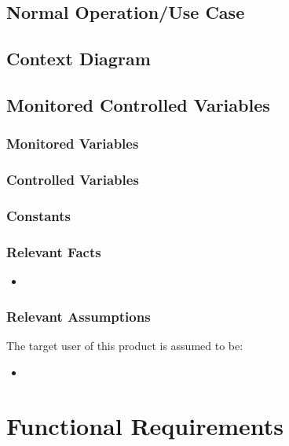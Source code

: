 \documentclass[12pt, titlepage]{article}
\begin{document}
\subsection{Normal Operation/Use Case}

\subsection{Context Diagram}



\subsection{Monitored Controlled Variables}

\subsubsection{Monitored Variables}

\subsubsection{Controlled Variables}

\subsubsection{Constants}

\subsubsection{Relevant Facts}

\begin{itemize}
\item
\end{itemize}

\subsubsection{Relevant Assumptions}

The target user of this product is assumed to be:
\begin{itemize}
\item
\end{itemize}

\section{Functional Requirements}
\end{document}
